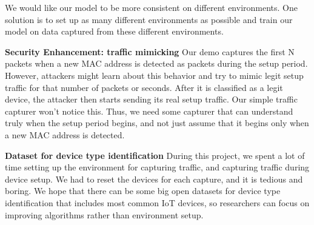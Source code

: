 \documentclass[twocolumn,10pt]{article}
\begin{document}
We would like our model to be more consistent on different environments. One solution is to set up as many different environments as possible and train our model on data captured from these different environments.

\textbf{Security Enhancement: traffic mimicking} Our demo captures the first N packets when a new MAC address is detected as packets during the setup period. However, attackers might learn about this behavior and try to mimic legit setup traffic for that number of packets or seconds. After it is classified as a legit device, the attacker then starts sending its real setup traffic. Our simple traffic capturer won’t notice this. Thus, we need some capturer that can understand truly when the setup period begins, and not just assume that it begins only when a new MAC address is detected. 

\textbf{Dataset for device type identification} During this project, we spent a lot of time setting up the environment for capturing traffic, and capturing traffic during device setup. We had to reset the devices for each capture, and it is tedious and boring. We hope that there can be some big open datasets for device type identification that includes most common IoT devices, so researchers can focus on improving algorithms rather than environment setup. 





\nocite{*} 

\normalbaselines
 
\end{document}
